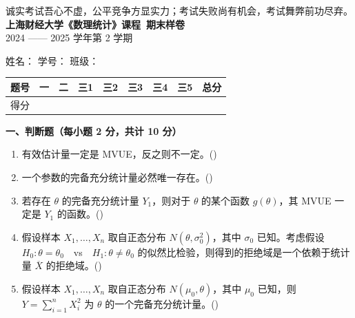 \documentclass[12pt,a4paper]{ctexart}
\newcommand{\question}[2]{\bigskip\noindent\textbf{#1}\par\nobreak\medskip}
\begin{document}
\begin{center}
  {\small 诚实考试吾心不虚，公平竞争方显实力；考试失败尚有机会，考试舞弊前功尽弃。}\\[2mm]
  {\LARGE\bfseries 上海财经大学《数理统计》课程\ 期末样卷}\\[2mm]
  {\small 2024 —— 2025 学年第 2 学期}
\end{center}

\vspace{2mm}
\noindent
姓名：\underline{\hspace{2.6cm}}\hfill
学号：\underline{\hspace{2.6cm}}\hfill
班级：\underline{\hspace{2.6cm}}

\vspace{3mm}
\begin{center}
\renewcommand{\arraystretch}{1.6}
\begin{tabular}{|c|c|c|c|c|c|c|c|c|}
\hline
题号 & 一 & 二 & 三1 & 三2 & 三3 & 三4 & 三5 & 总分 \\ \hline
得分 & & & & & & & & \\ \hline
\end{tabular}
\end{center}

\question{一、判断题（每小题 2 分，共计 10 分）}{10}
\begin{enumerate}[label=\arabic*.,leftmargin=2.2em]
  \item 有效估计量一定是 MVUE，反之则不一定。\hfill(\underline{\hspace{1.2cm}})
  \item 一个参数的完备充分统计量必然唯一存在。\hfill(\underline{\hspace{1.2cm}})
  \item 若存在 $\theta$ 的完备充分统计量 $Y_{1}$，则对于 $\theta$ 的某个函数 $g(\theta)$，其 MVUE 一定是 $Y_{1}$ 的函数。\hfill(\underline{\hspace{1.2cm}})
  \item 假设样本 $X_{1},\ldots,X_{n}$ 取自正态分布 $N(\theta,\sigma_{0}^{2})$，其中 $\sigma_{0}$ 已知。考虑假设 $H_{0}:\theta=\theta_{0}$\ \ vs\ \ $H_{1}:\theta\neq\theta_{0}$ 的似然比检验，则得到的拒绝域是一个依赖于统计量 $\overline{X}$ 的拒绝域。\hfill(\underline{\hspace{1.2cm}})
  \item 假设样本 $X_{1},\ldots,X_{n}$ 取自正态分布 $N(\mu_{0},\theta)$，其中 $\mu_{0}$ 已知，则 $Y=\sum_{i=1}^{n}X_{i}^{2}$ 为 $\theta$ 的一个完备充分统计量。\hfill(\underline{\hspace{1.2cm}})
\end{enumerate}
\end{document}
